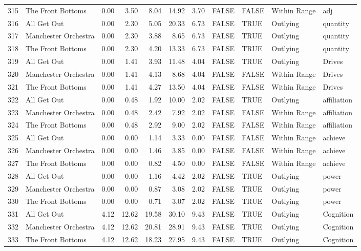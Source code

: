 \begin{table}[ht]
\begin{tabular}{rlrrrrrllll}
  315 & The Front Bottoms & 0.00 & 3.50 & 8.04 & 14.92 & 3.70 & FALSE & FALSE & Within Range & adj \\ 
  316 & All Get Out & 0.00 & 2.30 & 5.05 & 20.33 & 6.73 & FALSE & TRUE & Outlying & quantity \\ 
  317 & Manchester Orchestra & 0.00 & 2.30 & 3.88 & 8.65 & 6.73 & FALSE & TRUE & Outlying & quantity \\ 
  318 & The Front Bottoms & 0.00 & 2.30 & 4.20 & 13.33 & 6.73 & FALSE & TRUE & Outlying & quantity \\ 
  319 & All Get Out & 0.00 & 1.41 & 3.93 & 11.48 & 4.04 & FALSE & TRUE & Outlying & Drives \\ 
  320 & Manchester Orchestra & 0.00 & 1.41 & 4.13 & 8.68 & 4.04 & FALSE & FALSE & Within Range & Drives \\ 
  321 & The Front Bottoms & 0.00 & 1.41 & 4.27 & 13.50 & 4.04 & FALSE & FALSE & Within Range & Drives \\ 
  322 & All Get Out & 0.00 & 0.48 & 1.92 & 10.00 & 2.02 & FALSE & TRUE & Outlying & affiliation \\ 
  323 & Manchester Orchestra & 0.00 & 0.48 & 2.42 & 7.92 & 2.02 & FALSE & FALSE & Within Range & affiliation \\ 
  324 & The Front Bottoms & 0.00 & 0.48 & 2.92 & 9.00 & 2.02 & FALSE & FALSE & Within Range & affiliation \\ 
  325 & All Get Out & 0.00 & 0.00 & 1.14 & 3.33 & 0.00 & FALSE & FALSE & Within Range & achieve \\ 
  326 & Manchester Orchestra & 0.00 & 0.00 & 1.46 & 3.85 & 0.00 & FALSE & FALSE & Within Range & achieve \\ 
  327 & The Front Bottoms & 0.00 & 0.00 & 0.82 & 4.50 & 0.00 & FALSE & FALSE & Within Range & achieve \\ 
  328 & All Get Out & 0.00 & 0.00 & 1.16 & 4.42 & 2.02 & FALSE & TRUE & Outlying & power \\ 
  329 & Manchester Orchestra & 0.00 & 0.00 & 0.87 & 3.08 & 2.02 & FALSE & TRUE & Outlying & power \\ 
  330 & The Front Bottoms & 0.00 & 0.00 & 0.71 & 3.07 & 2.02 & FALSE & TRUE & Outlying & power \\ 
  331 & All Get Out & 4.12 & 12.62 & 19.58 & 30.10 & 9.43 & FALSE & TRUE & Outlying & Cognition \\ 
  332 & Manchester Orchestra & 4.12 & 12.62 & 20.81 & 28.91 & 9.43 & FALSE & TRUE & Outlying & Cognition \\ 
  333 & The Front Bottoms & 4.12 & 12.62 & 18.23 & 27.95 & 9.43 & FALSE & TRUE & Outlying & Cognition \\ 

\end{tabular}
\end{table}
